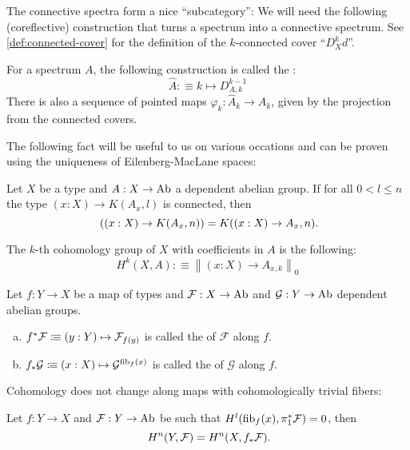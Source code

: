 The connective spectra form a nice ``subcategory'':
We will need the following (coreflective) construction that turns a spectrum into a connective spectrum.
See \cref{def:connected-cover} for the definition of the $k$-connected cover ``$D^k_Xd$''.

\begin{definition}
  For a spectrum $A$,
  the following construction is called the :
  \[ \hat{A}:\equiv k\mapsto D_{A,k}^{k-1}\]
  There is also a sequence of pointed maps $\varphi_k:\hat{A}_k\to A_k$, given by the projection from the connected covers.
\end{definition}

The following fact will be useful to us on various occations and can be proven using the uniqueness of Eilenberg-MacLane spaces:

\begin{lemma}
  \label{em-comm-pi}
  Let $X$ be a type and $A:X\to\operatorname{Ab}$ a dependent abelian group.
  If for all $0<l\leq n$ the type $(x:X)\to K(A_x,l)$ is connected, then
  \[
    ((x:X)\to K(A_x,n)) = K((x:X)\to A_x,n)
    \rlap{.}
  \]
\end{lemma}

\begin{definition}
  The $k$-th cohomology group of $X$ with coefficients in $A$ is the following:
  \[ H^k(X,A):\equiv\left\|(x:X)\to A_{x,k}\right\|_0 \]
\end{definition}

\begin{definition}
  Let $f:Y\to X$ be a map of types and $\mathcal F:X\to \operatorname{Ab}$ and $\mathcal G:Y\to \operatorname{Ab}$ dependent abelian groups.
  \begin{enumerate}[(a)]
  \item $f^\ast \mathcal F\vcentcolon\mspace{-1.2mu}\equiv (y:Y)\mapsto \mathcal F_{f(y)}$ is called the  of $\mathcal F$ along $f$.
  \item $f_{\ast}\mathcal G\vcentcolon\mspace{-1.2mu}\equiv (x:X)\mapsto \mathcal G^{\mathrm{fib}_f(x)}$ is called the  of $\mathcal G$ along $f$.
  \end{enumerate}
\end{definition}

Cohomology does not change along maps with cohomologically trivial fibers:

\begin{lemma}
  \label{cohomologically-trivial-fibers}
  Let $f:Y\to X$ and $\mathcal F:Y\to\operatorname{Ab}$ be such that $H^l(\mathrm{fib}_f(x),\pi_1^\ast\mathcal F)=0$,
  then
  \[
    H^n(Y,\mathcal F)=H^n(X,f_\ast\mathcal F)
    \rlap{.}
  \]
\end{lemma}

